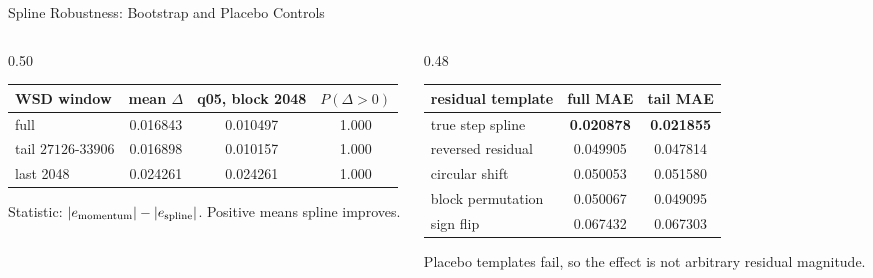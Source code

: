 \documentclass[fontset=fandol,aspectratio=169,10pt]{ctexbeamer}
\newcommand{\smallnote}[1]{{\scriptsize\color{tdltGray}#1}}
\begin{document}
\begin{frame}{Spline Robustness: Bootstrap and Placebo Controls}
  \begin{columns}[T,onlytextwidth]
    \begin{column}{0.50\textwidth}
      \begin{table}
        \centering
        \scriptsize
        \begin{tabular}{lccc}
          \toprule
          WSD window & mean \(\Delta\) & q05, block 2048 & \(P(\Delta>0)\)\\
          \midrule
          full & 0.016843 & 0.010497 & 1.000\\
          tail \(27126\)-\(33906\) & 0.016898 & 0.010157 & 1.000\\
          last 2048 & 0.024261 & 0.024261 & 1.000\\
          \bottomrule
        \end{tabular}
      \end{table}
      \smallnote{Statistic: \(|e_{\rm momentum}|-|e_{\rm spline}|\). Positive means spline improves.}
    \end{column}
    \begin{column}{0.48\textwidth}
      \begin{table}
        \centering
        \scriptsize
        \begin{tabular}{lcc}
          \toprule
          residual template & full MAE & tail MAE\\
          \midrule
          true step spline & \textbf{0.020878} & \textbf{0.021855}\\
          reversed residual & 0.049905 & 0.047814\\
          circular shift & 0.050053 & 0.051580\\
          block permutation & 0.050067 & 0.049095\\
          sign flip & 0.067432 & 0.067303\\
          \bottomrule
        \end{tabular}
      \end{table}
      \smallnote{Placebo templates fail, so the effect is not arbitrary residual magnitude.}
    \end{column}
  \end{columns}
\end{frame}
\end{document}
